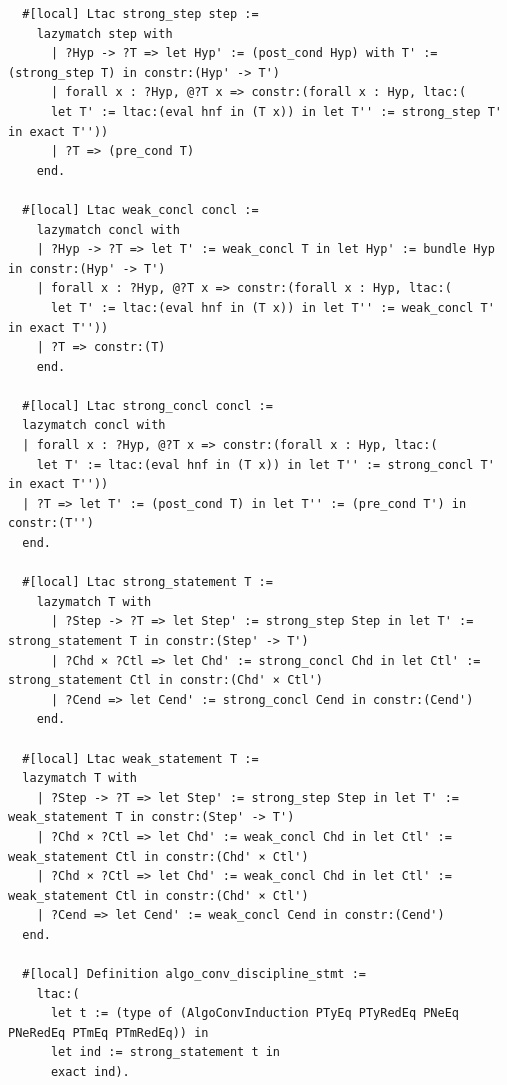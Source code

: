 \documentclass[10pt,a4paper]{amsart}
\begin{document}
\begin{lstlisting}
  #[local] Ltac strong_step step :=
    lazymatch step with
      | ?Hyp -> ?T => let Hyp' := (post_cond Hyp) with T' := (strong_step T) in constr:(Hyp' -> T')
      | forall x : ?Hyp, @?T x => constr:(forall x : Hyp, ltac:(
      let T' := ltac:(eval hnf in (T x)) in let T'' := strong_step T' in exact T''))
      | ?T => (pre_cond T)
    end.

  #[local] Ltac weak_concl concl :=
    lazymatch concl with
    | ?Hyp -> ?T => let T' := weak_concl T in let Hyp' := bundle Hyp in constr:(Hyp' -> T')
    | forall x : ?Hyp, @?T x => constr:(forall x : Hyp, ltac:(
      let T' := ltac:(eval hnf in (T x)) in let T'' := weak_concl T' in exact T''))
    | ?T => constr:(T)
    end.

  #[local] Ltac strong_concl concl :=
  lazymatch concl with
  | forall x : ?Hyp, @?T x => constr:(forall x : Hyp, ltac:(
    let T' := ltac:(eval hnf in (T x)) in let T'' := strong_concl T' in exact T''))
  | ?T => let T' := (post_cond T) in let T'' := (pre_cond T') in constr:(T'')
  end.

  #[local] Ltac strong_statement T :=
    lazymatch T with
      | ?Step -> ?T => let Step' := strong_step Step in let T' := strong_statement T in constr:(Step' -> T')
      | ?Chd × ?Ctl => let Chd' := strong_concl Chd in let Ctl' := strong_statement Ctl in constr:(Chd' × Ctl')
      | ?Cend => let Cend' := strong_concl Cend in constr:(Cend')
    end.

  #[local] Ltac weak_statement T :=
  lazymatch T with
    | ?Step -> ?T => let Step' := strong_step Step in let T' := weak_statement T in constr:(Step' -> T')
    | ?Chd × ?Ctl => let Chd' := weak_concl Chd in let Ctl' := weak_statement Ctl in constr:(Chd' × Ctl')
    | ?Chd × ?Ctl => let Chd' := weak_concl Chd in let Ctl' := weak_statement Ctl in constr:(Chd' × Ctl')
    | ?Cend => let Cend' := weak_concl Cend in constr:(Cend')
  end.

  #[local] Definition algo_conv_discipline_stmt := 
    ltac:(
      let t := (type of (AlgoConvInduction PTyEq PTyRedEq PNeEq PNeRedEq PTmEq PTmRedEq)) in
      let ind := strong_statement t in
      exact ind).


\end{lstlisting}
\end{document}
